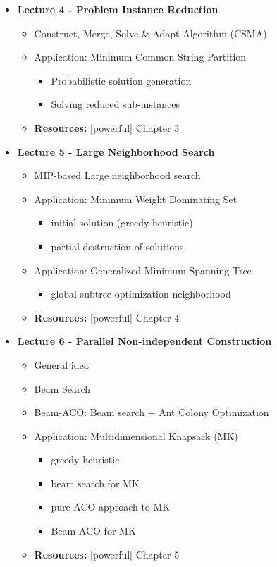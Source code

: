 \documentclass{article}
\begin{document}
\begin{itemize}
    \item \textbf{Lecture 4 - Problem Instance Reduction}
    \begin{itemize}
        \item Construct, Merge, Solve \& Adapt Algorithm (CSMA)
        \item Application: Minimum Common String Partition
        \begin{itemize}
            \item Probabilistic solution generation
            \item Solving reduced sub-instances
        \end{itemize}
        \item \textbf{Resources:} [powerful] Chapter 3
    \end{itemize}

    \item \textbf{Lecture 5 - Large Neighborhood Search}
    \begin{itemize}
        \item MIP-based Large neighborhood search
        \item Application: Minimum Weight Dominating Set
        \begin{itemize}
            \item initial solution (greedy heuristic)
            \item partial destruction of solutions
        \end{itemize}
        \item Application: Generalized Minimum Spanning Tree
        \begin{itemize}
            \item global subtree optimization neighborhood
        \end{itemize}
        \item \textbf{Resources:} [powerful] Chapter 4
    \end{itemize}

    \item \textbf{Lecture 6 - Parallel Non-independent Construction}
    \begin{itemize}
        \item General idea
        \item Beam Search
        \item Beam-ACO: Beam search + Ant Colony Optimization
        \item Application: Multidimensional Knapsack (MK)
        \begin{itemize}
            \item greedy heuristic
            \item beam search for MK
            \item pure-ACO approach to MK
            \item Beam-ACO for MK
        \end{itemize}
        \item \textbf{Resources:} [powerful] Chapter 5
    \end{itemize}


\end{itemize}
\end{document}
